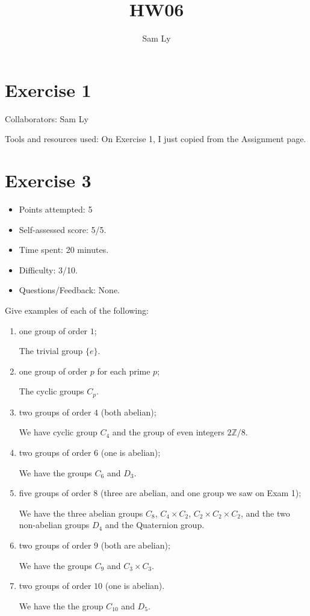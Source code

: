 \documentclass{article}
\title{HW06}
\author{Sam Ly}
\begin{document}
\maketitle

\section*{Exercise 1}
Collaborators: Sam Ly

\noindent
Tools and resources used: 
On Exercise 1, I just copied from the Assignment page. 
\pagebreak

\section*{Exercise 3}
\begin{itemize}
  \item Points attempted: 5
  \item Self-assessed score: 5/5.
  \item Time spent: 20 minutes.
  \item Difficulty: 3/10.
  \item Questions/Feedback: None.
\end{itemize}

Give examples of each of the following:
  
\begin{enumerate}
    \item {
        one group of order \(1\);

        The trivial group \(\{e\}\).
    }
    \item {
        one group of order \(p\) for each prime \(p\);

        The cyclic groups \(C_p\).
    }
    \item { 
        two groups of order \(4\) (both abelian);

        We have cyclic group \(C_4\) and the group of even integers \(2 \mathbb{Z} / 8\). 
    }

    \item {
        two groups of order \(6\) (one is abelian);

        We have the groups \(C_6\) and \(D_3\).
    }
    \item {
        five groups of order \(8\) (three are abelian, and one group we saw on Exam 1);

        We have the three abelian groups \(C_8\), \(C_4 \times C_2\), 
        \(C_2 \times C_2 \times C_2\), and the two non-abelian groups \(D_4\) 
        and the Quaternion group.
    }
    \item {
        two groups of order \(9\) (both are abelian); 

        We have the groups \(C_9\) and \(C_3 \times C_3\).
    }
    \item {
        two groups of order \(10\) (one is abelian).

        We have the the group \(C_10\) and \(D_5\).
    }
\end{enumerate}
\pagebreak
\end{document}
